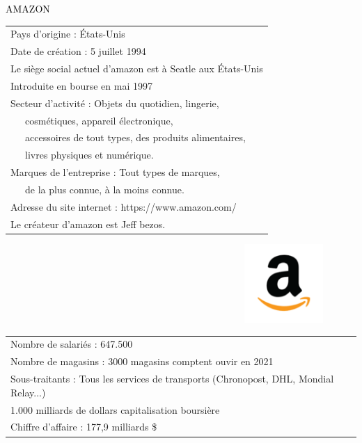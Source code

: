 \documentclass[12pt,landscape]{article}
\begin{document}
\begin{center}
		\Huge
               \colorbox[RGB]{248,157,48}{ \textcolor{black}{AMAZON}}
        \normalsize
    \end{center}
\begin{multicols}{2}
\begin{tabular}{l}
	  \rowcolor[RGB]{248,157,48} Pays d'origine : \'Etats-Unis \\
	  \rowcolor[RGB]{248,157,48} Date de création : 5 juillet 1994 \\
	  \rowcolor[RGB]{248,157,48}Le siège social actuel d'amazon est à Seatle aux \'Etats-Unis\\
	  \rowcolor[RGB]{248,157,48} Introduite en bourse en mai 1997\\
	  \rowcolor[RGB]{248,157,48} Secteur d'activité : Objets du quotidien, lingerie,\\
	  \rowcolor[RGB]{248,157,48} ~~~cosmétiques, appareil électronique,\\
	  \rowcolor[RGB]{248,157,48} ~~~accessoires de tout types, des produits alimentaires,\\
	  \rowcolor[RGB]{248,157,48} ~~~livres physiques et numérique.\\
	  \rowcolor[RGB]{248,157,48} Marques de l'entreprise : Tout types de marques,\\
      \rowcolor[RGB]{248,157,48} ~~~de la plus connue, à la moins connue. \\
	  \rowcolor[RGB]{248,157,48}Adresse du site internet : https://www.amazon.com/ \\
	  \rowcolor[RGB]{248,157,48} Le créateur d'amazon est Jeff bezos. \\
\end{tabular}
\begin{center}
~~~~~~~~~~~~~~~~~~~~~~~~~~~~~~~~~~~~~~~~~~~~~~~~~\includegraphics[width=3cm]{120px-Amazon_icon.png}
\end{center}
\begin{tabular}{l}
 \rowcolor[RGB]{248,157,48}	  Nombre de salariés : 647.500\\
 \rowcolor[RGB]{248,157,48}	  Nombre de magasins : 3000 magasins comptent ouvir en 2021\\
 \rowcolor[RGB]{248,157,48}	  Sous-traitants : Tous les services de transports (Chronopost, DHL, Mondial Relay...) \\
 \rowcolor[RGB]{248,157,48}	  1.000 milliards de dollars capitalisation boursière \\
 \rowcolor[RGB]{248,157,48}	  Chiffre d'affaire : 177,9 milliards \$ \\
\end{tabular}
\end{multicols}
\end{document}
